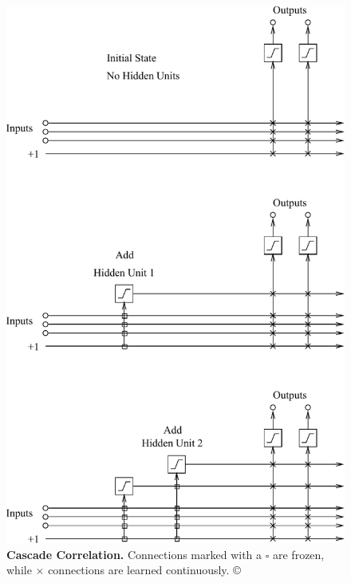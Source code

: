 \documentclass[thesis]{subfiles}
\begin{document}
	\begin{figure}[tbp]
		\centering
		\includegraphics{Figs/PDF/fahlmancascade}
		\caption[Cascade correlation.]{\textbf{Cascade Correlation.} Connections marked with a $\square$ are frozen, while $\times$ connections are learned continuously. \copyright \citet{Fahlman1989}}
		\label{fig:cascadecorrelation}
	\end{figure}
	
\end{document}
